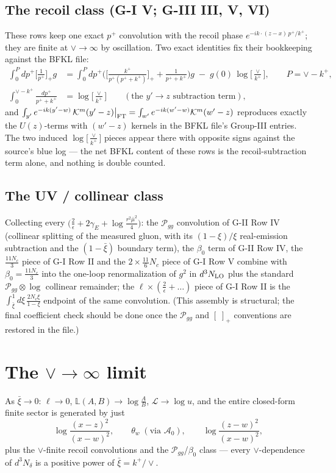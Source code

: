 \documentclass[11pt]{article}
\newcommand{\K}{\mathcal{K}}
\newcommand{\LB}{\log\!\big[\tfrac{\vee}{k^{+}}\big]}
\newcommand{\xib}{\bar{\xi}}
\newcommand{\Azero}{\mathcal{A}_{0}}
\begin{document}
\subsection{The recoil class (G-I V; G-III III, V, VI)}
These rows keep one exact $p^{+}$ convolution with the recoil phase
$e^{-ik\cdot(z-x)\,p^{+}/k^{+}}$; they are finite at $\vee\to\infty$ by oscillation. Two
exact identities fix their bookkeeping against the BFKL file:
\begin{align}
\int_{0}^{P}\!\!dp^{+}\Big[\tfrac1{p^{+}}\Big]_{+}g
&=\int_{0}^{P}\!\!dp^{+}\Big(\Big[\tfrac{k^{+}}{p^{+}(p^{+}+k^{+})}\Big]_{+}+\tfrac1{p^{+}+k^{+}}\Big)g
\;-\;g(0)\,\LB ,\qquad P=\vee-k^{+},\\
\int_{0}^{\vee-k^{+}}\frac{dp^{+}}{p^{+}+k^{+}}&=\LB\qquad(\text{the }y'\!\to\!z\text{ subtraction term}),
\end{align}
and $\int_{y'}e^{-ik(y'-w)}\,\K^{m}(y'-z)\big|_{\rm FT}=\int_{w'}e^{-ik(w'-w)}\K^{m}(w'-z)$
reproduces exactly the $U(z)$-terms with $(w'-z)$ kernels in the BFKL file's Group-III
entries. The two induced $\LB$ pieces appear there with opposite signs against the source's
blue log --- the net BFKL content of these rows is the recoil-subtraction term alone, and
nothing is double counted.

\subsection{The UV / collinear class}
Collecting every $\big(\tfrac2\epsilon+2\gamma_{E}+\log\tfrac{r^{2}\bar\mu^{2}}{4}\big)$:
the $\mathcal P_{gg}$ convolution of G-II Row IV (collinear splitting of the measured
gluon, with its $(1-\xi)/\xi$ real-emission subtraction and the $(1-\xib)$ boundary term),
the $\beta_{0}$ term of G-II Row IV, the $\tfrac{11N_{c}}{3}$ piece of G-I Row II and the
$2\times\tfrac{11}{6}N_{c}$ piece of G-I Row V combine with $\beta_{0}=\tfrac{11N_{c}}{3}$
into the one-loop renormalization of $g^{2}$ in $d^{3}N_{\rm LO}$ plus the standard
$\mathcal P_{gg}\otimes\log$ collinear remainder; the $\ell\times(\tfrac2\epsilon+\dots)$
piece of G-I Row II is the $\int_{\xib}^{1}d\xi\,\tfrac{2N_{c}\xi}{1-\xi}$ endpoint of the
same convolution. (This assembly is structural; the final coefficient check should be done
once the $\mathcal P_{gg}$ and $[\;]_{+}$ conventions are restored in the file.)

\section{The $\vee\to\infty$ limit}
As $\xib\to0$: $\ell\to0$, $\mathbb L(A,B)\to\log\tfrac{A}{B}$, $\mathcal L\to\log u$, and the
entire closed-form finite sector is generated by just
\[
\log\frac{(x-z)^{2}}{(x-w)^{2}},\qquad
\theta_{w}\;(\text{via }\Azero),\qquad
\log\frac{(z-w)^{2}}{(x-w)^{2}},
\]
plus the $\vee$-finite recoil convolutions and the $\mathcal P_{gg}$/$\beta_{0}$ class ---
every $\vee$-dependence of $d^{3}N_{\delta}$ is a positive power of $\xib=k^{+}/\vee$.
\end{document}

